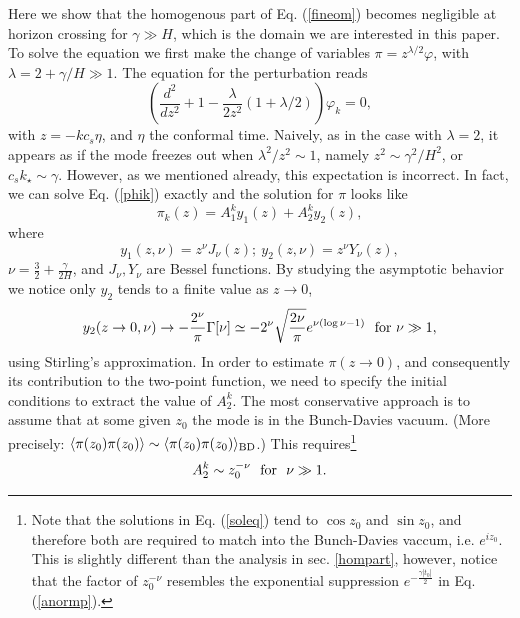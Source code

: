 \documentclass[11pt,amsmath,floats,floatfix,nofootinbib,secnumarabic, superscriptaddress, tightenlines]{revtex4}
\newcommand{\beq}{\begin{equation}}
\newcommand{\eeq}{\end{equation}}
\begin{document}
{Here we show that the homogenous part of Eq. (\ref{fineom}) becomes negligible at horizon crossing for $\gamma \gg H$, which is the domain we are interested in this paper. To solve the equation we first make the change of variables $\pi = z^{\lambda/2} \varphi$, with $\lambda = 2 + \gamma/H \gg 1$. The equation for the perturbation reads
\beq
\label{phik}
\left(\frac{d^2}{dz^2}+ 1 - \frac{\lambda}{2z^2}(1+\lambda/2)\right)\varphi_k=0,
\eeq
with $z=-kc_s\eta$, and $\eta$ the conformal time. Naively, as in the case with $\lambda=2$, it appears as if the mode freezes out when $\lambda^2/z^2 \sim 1$, namely $z^2 \sim \gamma^2/H^2$, or $c_s k_\star \sim \gamma$. However, as we mentioned already, this expectation is incorrect. In fact, we can solve Eq. (\ref{phik}) exactly and the solution for $\pi$ looks like
\beq
\pi_k(z) = A^k_1 y_1(z) + A^k_2 y_2(z),
\eeq
where
\beq
\label{soleq}
y_1(z,\nu) = z^{\nu}J_\nu(z);~y_2(z,\nu) = z^\nu Y_\nu(z),
\eeq
$\nu=\frac{3}{2} + \frac{\gamma}{2H}$, and $J_\nu,Y_\nu$ are Bessel functions. By studying the asymptotic behavior we notice only $y_2$ tends to a finite value as $z\to 0$,
\beq
y_2(z \to 0 ,\nu) \to -\frac{2^\nu}{\pi} \Gamma[\nu] \simeq - 2^\nu \sqrt{\frac{2\nu}{\pi}} e^{\nu(\log\nu-1)}  ~~{\rm for}~\nu \gg 1,
\eeq
using Stirling's approximation. In order to estimate $\pi(z \to 0)$, and consequently its contribution to the two-point function, we need to specify the initial conditions to extract the value of $A_2^k$. The most conservative approach is to assume that at some given $z_0$ the mode is in the Bunch-Davies vacuum. (More precisely: $\langle \pi(z_0)\pi(z_0)\rangle \sim \langle \pi(z_0)\pi(z_0)\rangle_{\rm BD}$.) This requires\footnote{Note that the solutions in Eq. (\ref{soleq}) tend to $\cos z_0$ and $\sin z_0$, and therefore both are required to match into the Bunch-Davies vaccum, i.e. $e^{iz_0}$. This is slightly different than the analysis in sec. \ref{hompart}, however, notice that the factor of $z_0^{-\nu}$ resembles the exponential suppression $e^{-\frac{\gamma|t_0|}{2}}$ in Eq. (\ref{anormp}).}
\beq A^k_2 \sim z_0^{-\nu}~~{\rm for}~~ \nu \gg 1.\eeq 

}
\end{document}
